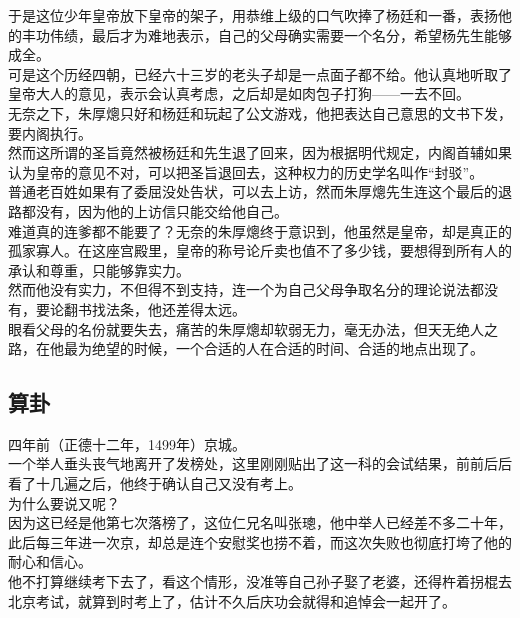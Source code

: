 \begin{multicols}{\theparacolNo}
于是这位少年皇帝放下皇帝的架子，用恭维上级的口气吹捧了杨廷和一番，表扬他的丰功伟绩，最后才为难地表示，自己的父母确实需要一个名分，希望杨先生能够成全。\\

可是这个历经四朝，已经六十三岁的老头子却是一点面子都不给。他认真地听取了皇帝大人的意见，表示会认真考虑，之后却是如肉包子打狗——一去不回。\\

无奈之下，朱厚熜只好和杨廷和玩起了公文游戏，他把表达自己意思的文书下发，要内阁执行。\\

然而这所谓的圣旨竟然被杨廷和先生退了回来，因为根据明代规定，内阁首辅如果认为皇帝的意见不对，可以把圣旨退回去，这种权力的历史学名叫作“封驳”。\\

普通老百姓如果有了委屈没处告状，可以去上访，然而朱厚熜先生连这个最后的退路都没有，因为他的上访信只能交给他自己。\\

难道真的连爹都不能要了？无奈的朱厚熜终于意识到，他虽然是皇帝，却是真正的孤家寡人。在这座宫殿里，皇帝的称号论斤卖也值不了多少钱，要想得到所有人的承认和尊重，只能够靠实力。\\

然而他没有实力，不但得不到支持，连一个为自己父母争取名分的理论说法都没有，要论翻书找法条，他还差得太远。\\

眼看父母的名份就要失去，痛苦的朱厚熜却软弱无力，毫无办法，但天无绝人之路，在他最为绝望的时候，一个合适的人在合适的时间、合适的地点出现了。\\

\subsection{算卦}
四年前（正德十二年，1499年）京城。\\

一个举人垂头丧气地离开了发榜处，这里刚刚贴出了这一科的会试结果，前前后后看了十几遍之后，他终于确认自己又没有考上。\\

为什么要说又呢？\\

因为这已经是他第七次落榜了，这位仁兄名叫张璁，他中举人已经差不多二十年，此后每三年进一次京，却总是连个安慰奖也捞不着，而这次失败也彻底打垮了他的耐心和信心。\\

他不打算继续考下去了，看这个情形，没准等自己孙子娶了老婆，还得杵着拐棍去北京考试，就算到时考上了，估计不久后庆功会就得和追悼会一起开了。\\


\end{multicols}
